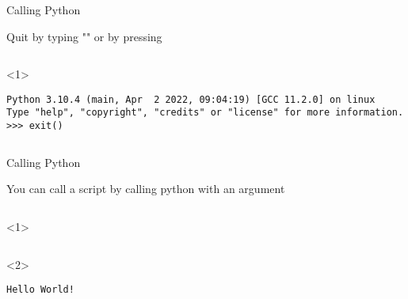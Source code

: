 
\begin{frame}[fragile]{Calling Python}

   Quit by typing "" or by pressing 

  \begin{columns}[onlytextwidth]
    \begin{column}{\textwidth}
      \begin{onlyenv}<1>
        \begin{lstlisting}[style=sh]
%*\LSTPrompt*) python
Python 3.10.4 (main, Apr  2 2022, 09:04:19) [GCC 11.2.0] on linux
Type "help", "copyright", "credits" or "license" for more information.
>>> exit() \end{lstlisting}
      \end{onlyenv}
    \end{column}
  \end{columns}
\end{frame}



\begin{frame}[fragile]{Calling Python}

   You can call a script by calling python with an argument

  \begin{columns}[onlytextwidth]
    \begin{column}{\textwidth}
      \begin{onlyenv}<1>
        \begin{lstlisting}[style=sh]
%*\LSTPrompt*) python my_script.py
 \end{lstlisting}
      \end{onlyenv}

      \begin{onlyenv}<2>
        \begin{lstlisting}[style=sh]
%*\LSTPrompt*) python my_script.py
Hello World! \end{lstlisting}
      \end{onlyenv}

    \end{column}
  \end{columns}
\end{frame}



